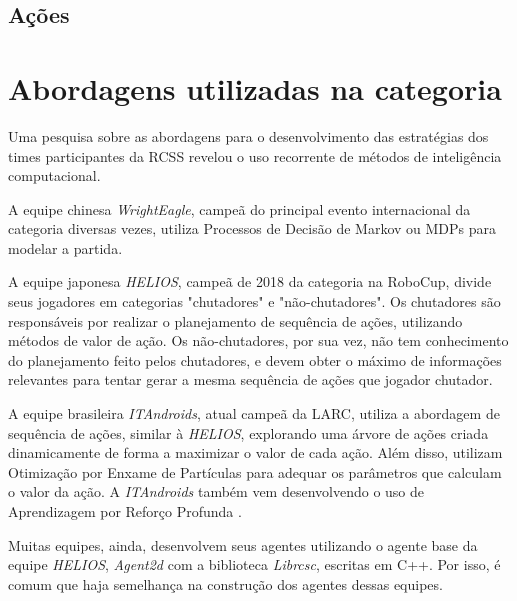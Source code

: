 
\subsection{Ações}


\section{Abordagens utilizadas na categoria}
\par Uma pesquisa sobre as abordagens para o desenvolvimento das estratégias dos times participantes da RCSS revelou o uso recorrente de métodos de inteligência computacional.
\par A equipe chinesa \textit{WrightEagle}, campeã do principal evento internacional da categoria diversas vezes, utiliza Processos de Decisão de Markov ou MDPs para modelar a partida\cite{bai2015online}.
\par A equipe japonesa \textit{HELIOS}, campeã de 2018 da categoria na RoboCup, divide seus jogadores em categorias "chutadores" e "não-chutadores".
Os chutadores são responsáveis por realizar o planejamento de sequência de ações, utilizando métodos de valor de ação.
Os não-chutadores, por sua vez, não tem conhecimento do planejamento feito pelos chutadores, e devem obter o máximo de informações relevantes para tentar gerar a mesma sequência de ações que jogador chutador\cite{nakashima2018helios2018}.
\par A equipe brasileira \textit{ITAndroids}, atual campeã da LARC, utiliza a abordagem de sequência de ações, similar à \textit{HELIOS}, explorando uma árvore de ações criada dinamicamente de forma a maximizar o valor de cada ação. Além disso, utilizam Otimização por Enxame de Partículas \cite{melloitandroids} para adequar os parâmetros que calculam o valor da ação. A \textit{ITAndroids} também vem desenvolvendo o uso de Aprendizagem por Reforço Profunda \cite{maximoitandroids}.
\par Muitas equipes, ainda, desenvolvem seus agentes utilizando o agente base da equipe \textit{HELIOS}, \textit{Agent2d} com a biblioteca \textit{Librcsc}, escritas em C++. Por isso, é comum que haja semelhança na construção dos agentes dessas equipes.
